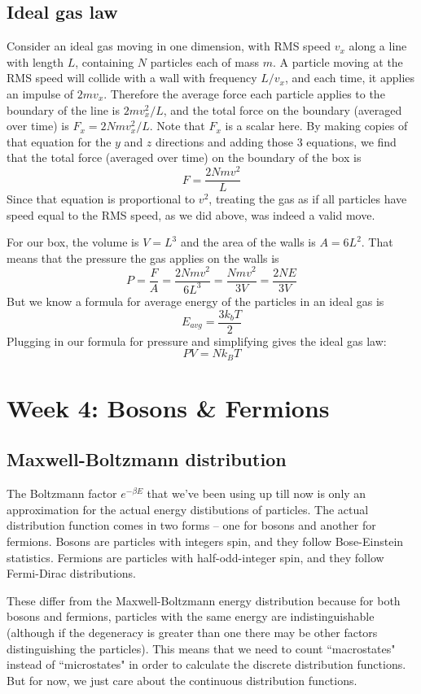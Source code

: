 \documentclass[12pt]{article}
\begin{document}
\subsection{Ideal gas law}
Consider an ideal gas moving in one dimension, with RMS speed $v_x$ along a line with length $L$, containing $N$ particles each of mass $m$. A particle moving at the RMS speed will collide with a wall with frequency $L / v_x$, and each time, it applies an impulse of $2 m v_x$. Therefore the average force each particle applies to the boundary of the line is $2 m v_x^2 / L$, and the total force on the boundary (averaged over time) is $F_x = 2 N m v_x^2 / L$. Note that $F_x$ is a scalar here. By making copies of that equation for the $y$ and $z$ directions and adding those 3 equations, we find that the total force (averaged over time) on the boundary of the box is
\[F= \frac{2Nmv^2}{L} \]
Since that equation is proportional to $v^2$, treating the gas as if all particles have speed equal to the RMS speed, as we did above, was indeed a valid move.

For our box, the volume is $V = L^3$ and the area of the walls is $A = 6L^2$. That means that the pressure the gas applies on the walls is
\[P = \frac{F}{A} = \frac{2Nmv^2}{6L^3} = \frac{Nmv^2}{3V} = \frac{2NE}{3V} \]
But we know a formula for average energy of the particles in an ideal gas is
\[E_{avg} = \frac{3 k_b T}{2}\]
Plugging in our formula for pressure and simplifying gives the ideal gas law:
\[P V = N k_B T\]

\section{Week 4: Bosons \& Fermions}

\subsection{Maxwell-Boltzmann distribution}
The Boltzmann factor $e^{-\beta E}$ that we've been using up till now is only an approximation for the actual energy distibutions of particles. The actual distribution function comes in two forms -- one for bosons and another for fermions. Bosons are particles with integers spin, and they follow Bose-Einstein statistics. Fermions are particles with half-odd-integer spin, and they follow Fermi-Dirac distributions.

These differ from the Maxwell-Boltzmann energy distribution because for both bosons and fermions, particles with the same energy are indistinguishable (although if the degeneracy is greater than one there may be other factors distinguishing the particles). This means that we need to count ``macrostates" instead of ``microstates" in order to calculate the discrete distribution functions. But for now, we just care about the continuous distribution functions.
\end{document}

